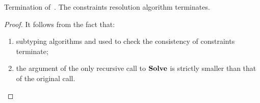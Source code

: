 \begin{theorem}{Termination of\ \solvectrdflt.}%
\label{thm:solvectr-terminates}
    The constraints resolution algorithm \solvectrdflt terminates.
\end{theorem}
\begin{proof}
    It follows from the fact that:
    \begin{enumerate}
        \item subtyping algorithms  and 
             used to check the consistency of 
            constraints terminate;
        \item the argument \UEnv of the only recursive call to $\operatorname{\mathbf{Solve}}$
            is strictly smaller than that of the original call.
    \end{enumerate} 
\end{proof}


